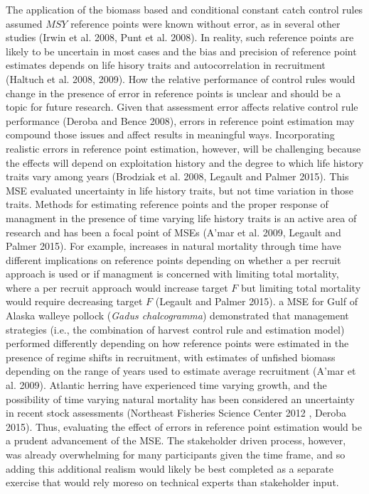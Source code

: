 \documentclass[]{article}
\begin{document}
The application of the biomass based and conditional constant catch
control rules assumed \(MSY\) reference points were known without error,
as in several other studies (Irwin et al. 2008, Punt et al. 2008). In
reality, such reference points are likely to be uncertain in most cases
and the bias and precision of reference point estimates depends on life
hisory traits and autocorrelation in recruitment (Haltuch et al. 2008,
2009). How the relative performance of control rules would change in the
presence of error in reference points is unclear and should be a topic
for future research. Given that assessment error affects relative
control rule performance (Deroba and Bence 2008), errors in reference
point estimation may compound those issues and affect results in
meaningful ways. Incorporating realistic errors in reference point
estimation, however, will be challenging because the effects will depend
on exploitation history and the degree to which life history traits vary
among years (Brodziak et al. 2008, Legault and Palmer 2015). This MSE
evaluated uncertainty in life history traits, but not time variation in
those traits. Methods for estimating reference points and the proper
response of managment in the presence of time varying life history
traits is an active area of research and has been a focal point of MSEs
(A'mar et al. 2009, Legault and Palmer 2015). For example, increases in
natural mortality through time have different implications on reference
points depending on whether a per recruit approach is used or if
managment is concerned with limiting total mortality, where a per
recruit approach would increase target \(F\) but limiting total
mortality would require decreasing target \(F\) (Legault and Palmer
2015). a MSE for Gulf of Alaska walleye pollock (\emph{Gadus
chalcogramma}) demonstrated that management strategies (i.e., the
combination of harvest control rule and estimation model) performed
differently depending on how reference points were estimated in the
presence of regime shifts in recruitment, with estimates of unfished
biomass depending on the range of years used to estimate average
recruitment (A'mar et al. 2009). Atlantic herring have experienced time
varying growth, and the possibility of time varying natural mortality
has been considered an uncertainty in recent stock assessments
(Northeast Fisheries Science Center 2012 , Deroba 2015). Thus,
evaluating the effect of errors in reference point estimation would be a
prudent advancement of the MSE. The stakeholder driven process, however,
was already overwhelming for many participants given the time frame, and
so adding this additional realism would likely be best completed as a
separate exercise that would rely moreso on technical experts than
stakeholder input.
\end{document}
